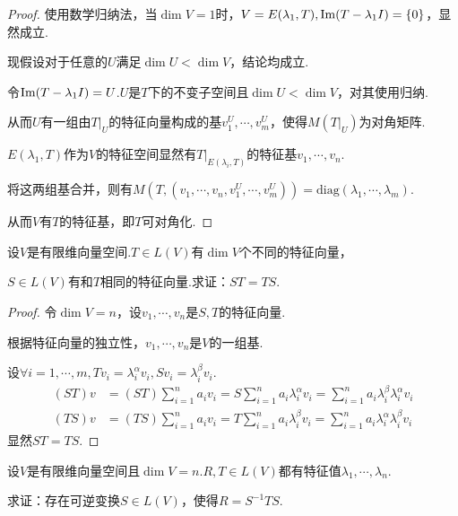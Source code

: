 \begin{proof}
    使用数学归纳法，当\(\dim V=1\)时，\(V=E(\lambda_1,T),\operatorname{Im}(T-\lambda_1 I)=\{0\}\)，显然成立.

    现假设对于任意的\(U\)满足\(\dim U<\dim V\)，结论均成立.
    
    令\(\operatorname{Im}(T-\lambda_1 I)=U\).\(U\)是\(T\)下的不变子空间且\(\dim U<\dim V\)，对其使用归纳.
    
    从而\(U\)有一组由\(T|_U\)的特征向量构成的基\(v_1^U,\cdots,v_m^U\)，使得\(M(T|_U)\)为对角矩阵.
    
    \(E(\lambda_1,T)\)作为\(V\)的特征空间显然有\(T|_{E(\lambda_i,T)}\)的特征基\(v_1,\cdots,v_n\).
    
    将这两组基合并，则有\(M(T,(v_1,\cdots,v_n,v_1^U,\cdots,v_m^U))=\mathrm{diag}(\lambda_1,\cdots,\lambda_m)\).
    
    从而\(V\)有\(T\)的特征基，即\(T\)可对角化.
\end{proof}

\newpage

\begin{problem}[6]\label{5.C.6}
    设\(V\)是有限维向量空间.\(T \in L(V)\)有\(\dim V\)个不同的特征向量，

    \(S \in L(V)\)有和\(T\)相同的特征向量.求证：\(ST=TS\).
\end{problem}

\begin{proof}
    令\(\dim V=n\)，设\(v_1,\cdots,v_n\)是\(S,T\)的特征向量.

    根据特征向量的独立性，\(v_1,\cdots,v_n\)是\(V\)的一组基.
    
    设\(\forall i=1,\cdots,m,Tv_i=\lambda_i^\alpha v_i,Sv_i=\lambda_i^\beta v_i\).
    \begin{align*}
        (ST)v &=(ST)\sum_{i=1}^n a_iv_i=S\sum_{i=1}^n a_i \lambda_i^\alpha v_i
                =\sum_{i=1}^n a_i \lambda_i^\beta \lambda_i^\alpha v_i \\
        (TS)v &=(TS)\sum_{i=1}^n a_iv_i=T\sum_{i=1}^n a_i \lambda_i^\beta v_i
                =\sum_{i=1}^n a_i \lambda_i^\alpha \lambda_i^\beta v_i
    \end{align*}
    显然\(ST=TS\).
\end{proof}

\begin{problem}[12]\label{5.C.12}
    设\(V\)是有限维向量空间且\(\dim V=n\).\(R,T \in L(V)\)都有特征值\(\lambda_1,\cdots,\lambda_n\).

    求证：存在可逆变换\(S \in L(V)\)，使得\(R=S^{-1}TS\).
\end{problem}

